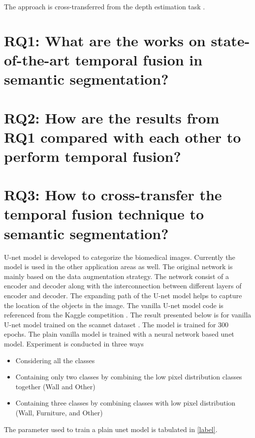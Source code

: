     The approach is cross-transferred from the depth estimation task \cite{52_hou2019multi} \cite{03_duzceker2021deepvideomvs}. 
    
    \section{RQ1: What are the works on state-of-the-art temporal fusion in semantic segmentation?}
	
	
	
    \section{RQ2: How are the results from RQ1 compared with each other to perform temporal fusion?}
    
    
    
    \section{RQ3: How to cross-transfer the temporal fusion technique to semantic segmentation?}
    
    U-net model is developed to categorize the biomedical images. Currently the model is used in the other application areas as well. The original network is mainly based on the data augmentation strategy. The network consist of a encoder and decoder along with the interconnection between different layers of encoder and decoder. The expanding path of the U-net model helps to capture the location of the objects in the image. The vanilla U-net model code is referenced from the Kaggle competition \cite{85_kag_challenge}. The result presented below is for vanilla U-net model trained on the scannet dataset \cite{79_dai2017scannet}. The model is trained for 300 epochs. The plain vanilla model is trained with a neural network based unet model. Experiment is conducted in three ways
    \begin{itemize}
    	\item Considering all the classes
    	\item Containing only two classes by combining the low pixel distribution classes together (Wall and Other)
    	\item Containing three classes by combining classes with low pixel distribution (Wall, Furniture, and Other)
    \end{itemize}
    
    
    The parameter used to train a plain unet model is tabulated in \ref{label}.
    
